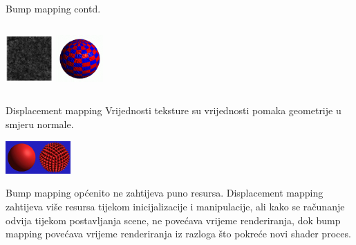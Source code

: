 \documentclass[9pt]{beamer}
\begin{document}
\begin{frame}{Bump mapping contd.}
\begin{columns}[t]
\begin{column}{7cm}
\begin{center}
				\includegraphics[width=1.8cm]{slike/bump_02_02.png}
				\includegraphics[width=1.8cm]{slike/bump_03_03.png}
			\end{center}
		\end{column}
	\end{columns}
\end{frame}
%
\begin{frame}{Displacement mapping}
	Vrijednosti teksture su vrijednosti pomaka geometrije u smjeru normale.
	\begin{center}
		\includegraphics[width=2.5cm]{slike/displacement_map.png}
	\end{center}
	\begin{block}{}
		Bump mapping općenito ne zahtijeva puno resursa. Displacement mapping zahtijeva više resursa tijekom
		inicijalizacije i manipulacije, ali kako se računanje odvija tijekom postavljanja scene, ne povećava vrijeme renderiranja, dok bump mapping povećava vrijeme renderiranja iz razloga što pokreće novi shader proces.
	\end{block}
	
	
\end{frame}
%
%	
\end{document}
